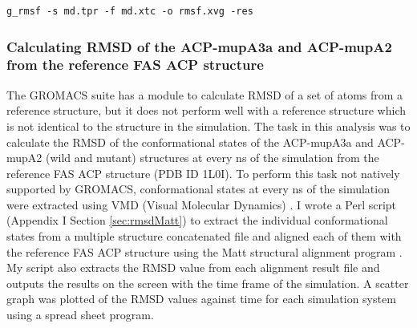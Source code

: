 \begin{lstlisting}
g_rmsf -s md.tpr -f md.xtc -o rmsf.xvg -res
\end{lstlisting}			
			
			
			\subsubsection{Calculating RMSD of the ACP-mupA3a and ACP-mupA2 from the reference FAS ACP structure}
			\label{sec:RMSDFASACP}
			The GROMACS suite has a module to calculate RMSD of a set of atoms from a reference structure, but it does not perform well with a reference structure which is not identical to the structure in the simulation. The task in this analysis was to calculate the RMSD of the conformational states of the ACP-mupA3a and ACP-mupA2 (wild and mutant) structures at every ns of the simulation from the reference FAS ACP structure (PDB ID 1L0I). To perform this task not natively supported by GROMACS, conformational states at every ns of the simulation were extracted using VMD (Visual Molecular Dynamics) \parencite{Humphrey1996}. I wrote a Perl script (Appendix I Section \ref{sec:rmsdMatt}) to extract the individual conformational states from a multiple structure concatenated file and aligned each of them with the reference FAS ACP structure using the Matt structural alignment program \parencite{Menke2008}. My script also extracts the RMSD value from each alignment result file and outputs the results on the screen with the time frame of the simulation. A scatter graph was plotted of the RMSD values against time for each simulation system using a spread sheet program. 
			
